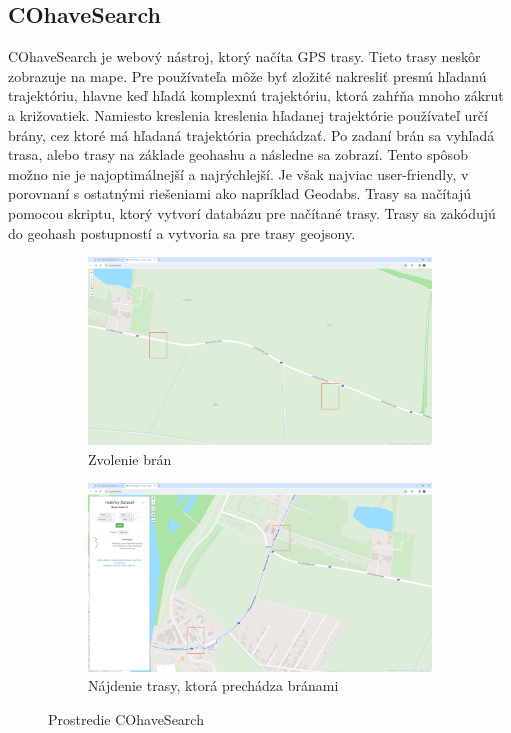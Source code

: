 \subsection{COhaveSearch}
COhaveSearch je webový nástroj, ktorý načíta GPS trasy. Tieto trasy neskôr zobrazuje na mape. Pre používateľa môže byť zložité nakresliť presnú hľadanú trajektóriu, hlavne keď hľadá komplexnú trajektóriu, ktorá zahŕňa mnoho zákrut a križovatiek. Namiesto kreslenia kreslenia hľadanej trajektórie používateľ určí brány, cez ktoré má hľadaná trajektória prechádzať. Po zadaní brán sa vyhľadá trasa, alebo trasy na základe geohashu a následne sa zobrazí. Tento spôsob možno nie je najoptimálnejší a najrýchlejší. Je však najviac user-friendly, v porovnaní s ostatnými riešeniami ako napríklad Geodabs. Trasy sa načítajú pomocou skriptu, ktorý vytvorí databázu pre načítané trasy. Trasy sa zakódujú do geohash postupností a vytvoria sa pre trasy geojsony. 
\begin{figure}[H]
\centering
\begin{subfigure}{.99\textwidth}
  \centering
  \includegraphics[width=\textwidth]{img/brany.png}
  \caption{Zvolenie brán}
\end{subfigure}
\begin{subfigure}{.99\textwidth}
  \centering
  \includegraphics[width=\textwidth]{img/match.png}
  \caption{Nájdenie trasy, ktorá prechádza bránami}
\end{subfigure}
\caption{Prostredie COhaveSearch}
\end{figure}

